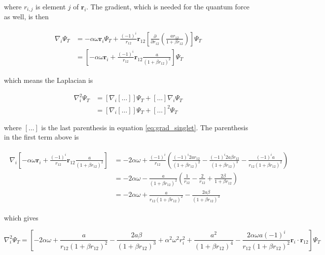 \documentclass[english, a4paper]{article}
\newcommand{\bm}[1]{\mathbf{#1}}
\begin{document}
	where $r_{i,j}$ is element $j$ of $\bm{r}_i$.
	The gradient, which is needed for the quantum force as well, is then
	
	\begin{align}
	\begin{split}
	\nabla_i\Psi_T &= -\alpha\omega\bm{r}_i\Psi_T + \frac{(-1)^i}{r_{12}}\bm{r}_{12}\left[\frac{\partial}{\partial r_{12}}\left(\frac{ar_{12}}{1+\beta r_{12}}\right)\right]\Psi_T\\
	&= \left[-\alpha\omega\bm{r}_i + \frac{(-1)^i}{r_{12}}\bm{r}_{12}\frac{a}{(1+\beta r_{12})^2}\right]\Psi_T
	\end{split}
	\label{eq:grad_singlet}
	\end{align} 
	
	which means the Laplacian is
	
	\begin{equation}
	\begin{split}
	\nabla_i^2\Psi_T &= \left[\nabla_i[\ldots]\right]\Psi_T + [\ldots]\nabla_i\Psi_T\\
	&= \left[\nabla_i[\ldots]\right]\Psi_T + [\ldots]^2\Psi_T
	\end{split}
	\end{equation}
	
	where $[\ldots]$ is the last parenthesis in equation \ref{eq:grad_singlet}. The parenthesis in the first term above is
	
	\begin{align}
	\begin{split}
	\nabla_i\left[-\alpha\omega\bm{r}_i + \frac{(-1)^i}{r_{12}}\bm{r}_{12}\frac{a}{(1+\beta r_{12})^2}\right] &= -2\alpha\omega + \frac{(-1)^i}{r_{12}}\left( \frac{(-1)^i2ar_{12}}{(1+\beta r_{12})^2} - \frac{(-1)^i2a\beta r_{12}}{(1+\beta r_{12})^3} - \frac{(-1)^ia}{r_{12}(1+\beta r_{12})^2}\right)\\
	&= -2\alpha\omega - \frac{a}{(1+\beta r_{12})^2}\left( \frac{1}{r_{12}} - \frac{2}{r_{12}} + \frac{2\beta}{1+\beta r_{12}}\right)\\
	&= -2\alpha\omega + \frac{a}{r_{12}(1+\beta r_{12})^2}- \frac{2a\beta}{(1+\beta r_{12})^3}
	\end{split}
	\end{align}
	
	which gives
	
	\begin{equation}
	\nabla_i^2\Psi_T = \left[-2\alpha\omega + \frac{a}{r_{12}(1+\beta r_{12})^2} - \frac{2a\beta}{(1+\beta r_{12})^3} + \alpha^2\omega^2r_i^2 + \frac{a^2}{(1+\beta r_{12})^4} - \frac{2\alpha\omega a(-1)^i}{r_{12}(1+\beta r_{12})^2}\bm{r}_i\cdot\bm{r}_{12}\right] \Psi_T
	\end{equation}
	
\end{document}
